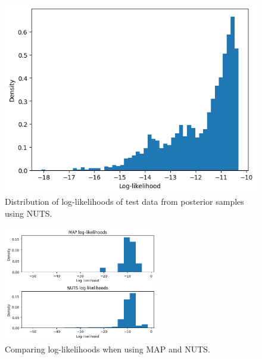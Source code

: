 \begin{figure}[p]
  \centering
  \includegraphics[width=.8\textwidth]{./figures/nuts_ll.png}
  \caption{
    Distribution of log-likelihoods of test data
    from posterior samples using NUTS.
  }
  \label{fig:gp:nuts:ll}
\end{figure}
%
\begin{figure}[p]
  \centering
  \includegraphics[width=0.6\textwidth]{./figures/map_nuts_ll.png}
  \caption{
    Comparing log-likelihoods when using MAP and NUTS.
  }
  \label{fig:gp:map_nuts_ll}
\end{figure}

